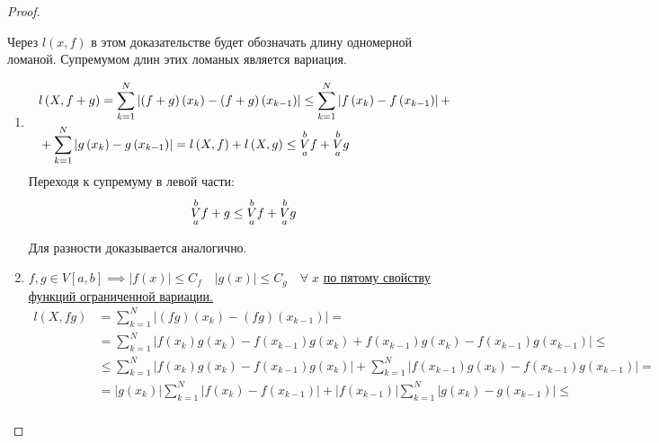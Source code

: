 \documentclass[../main.tex]{subfiles}
\begin{document}
\begin{proof}
    
    ~

    Через \( l \left( x,f\right)\) в этом доказательстве будет обозначать длину одномерной ломаной. Супремумом длин этих ломаных является вариация. 

    \begin{enumerate}
        \item 
        \begin{equation*}
            \begin{aligned}
                &l \left( X, f+g\right)= \sum\limits_{ k=1}^{ N} \left| \left( f+g\right)\left( x_k\right)-\left( f+g\right)\left( x_{k-1}\right)\right| \leq \sum\limits_{ k=1}^{ N} \left| f\left( x_k\right)-f\left( x_{k-1}\right)\right|+ \\
                &+\sum\limits_{ k=1}^{ N} \left| g\left( x_k \right)-g\left( x_{k-1}\right)\right|=l \left( X, f\right)+l \left( X, g\right) \leq \underset{ a}{\overset{ b}{V}} f + \underset{ a}{\overset{ b}{V}}g 
            \end{aligned}
        \end{equation*}
        Переходя к супремуму в левой части:
        \[ \underset{ a}{\overset{ b}{V}} f+g \leq \underset{ a}{\overset{ b}{V}} f+ \underset{ a}{\overset{ b}{V}} g\]
        \par Для разности доказывается аналогично. 
        \item \( f,g \in V\left[ a,b\right] \implies \left| f\left( x\right)\right| \leq C_f\quad \left| g \left( x\right)\right| \leq C_g\quad \forall \; x\) \hyperlink{thm:variatsiya_prop}{по пятому свойству функций ограниченной вариации.}
        \begin{equation*}
            \begin{aligned}
                l \left( X, fg\right)&= \sum\limits_{ k=1}^{ N} \left| \left( fg\right)\left( x_k\right)-\left( fg\right)\left( x_{k-1}\right)\right|=\\
                &=\sum\limits_{ k=1}^{ N} \left| f\left( x_k\right)g \left( x_k\right)-f\left( x_{k-1}\right)g\left( x_k\right)+f\left( x_{k-1}\right)g\left( x_k\right)-f\left( x_{k-1}\right)g\left( x_{k-1}\right)\right| \leq \\
                & \leq \sum\limits_{ k=1}^{ N} \left| f\left( x_k\right)g \left( x_k\right)-f\left( x_{k-1}\right)g \left( x_k\right)\right| + \sum\limits_{ k=1}^{ N} \left| f\left( x_{k-1}\right)g \left( x_k\right)-f\left( x_{k-1}\right)g\left( x_{k-1}\right)\right|=\\
                &=\left| g \left( x_k\right)\right| \sum\limits_{ k=1}^{ N} \left| f \left( x_k\right)-f\left( x_{k-1}\right)\right|+\left| f\left( x_{k-1}\right)\right| \sum\limits_{ k=1}^{ N} \left| g \left( x_{k}\right)-g \left( x_{k-1}\right)\right| \leq \\

\end{aligned}
\end{equation*}
\end{enumerate}
\end{proof}
\end{document}

